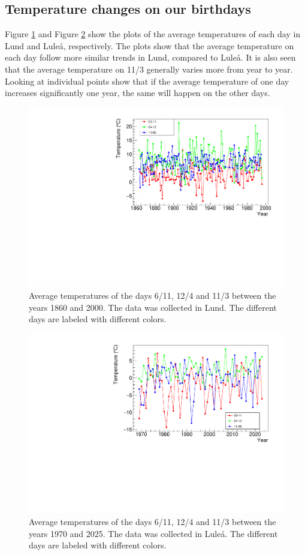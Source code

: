 \subsection{Temperature changes on our birthdays}

Figure \ref{fig:lund} and Figure \ref{fig:luleå} show the plots of the average temperatures of each day in Lund and Luleå, respectively. The plots show that the average temperature on each day follow more similar trends in Lund, compared to Luleå. It is also seen that the average temperature on 11/3 generally varies more from year to year. Looking at individual points show that if the average temperature of one day increases significantly one year, the same will happen on the other days.

\begin{figure}[H]
    \centering
    \includegraphics[width=0.85\linewidth]{../plots/bdays/Lundbdays.pdf}
    \caption{Average temperatures of the days 6/11, 12/4 and 11/3 between the years 1860 and 2000. The data was collected in Lund. The different days are labeled with different colors.}
    \label{fig:lund}
\end{figure}


\begin{figure}[H]
    \centering
    \includegraphics[width=0.85\linewidth]{../plots/bdays/Luleabdays.pdf}
    \caption{Average temperatures of the days 6/11, 12/4 and 11/3 between the years 1970 and 2025. The data was collected in Luleå. The different days are labeled with different colors.}
    \label{fig:luleå}
\end{figure}


